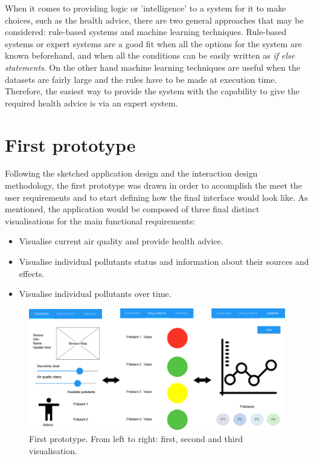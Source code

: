 When it comes to providing logic or 'intelligence' to a system for it to make choices, such as the health advice, there are two general approaches that may be considered: rule-based systems and machine learning techniques. Rule-based systems or expert systems are a good fit when all the options for the system are known beforehand, and when all the conditions can be easily written as \textit{if else statements}. On the other hand machine learning techniques are useful when the datasets are fairly large and the rules have to be made at execution time. Therefore, the easiest way to provide the system with the capability to give the required health advice is via an expert system.

\section{First prototype}
Following the sketched application design and the interaction design methodology, the first prototype was drawn in order to accomplish the meet the user requirements and to start defining how the final interface would look like. As mentioned, the application would be composed of three final distinct visualisations for the main functional requirements:

\begin{itemize}
    \item Visualise current air quality and provide health advice.
    \item Visualise individual pollutants status and information about their sources and effects.
    \item Visualise individual pollutants over time.
\end{itemize}


\begin{figure}[H]
\begin{adjustbox}{width=1.2\textwidth,center=\textwidth}
  \centering
  \includegraphics[scale=1]{images/firstPrototype.png}
\end{adjustbox}
  \caption[Frist prototype]{First prototype. From left to right: first, second and third visualisation.}
  \label{fig:first_visualization_first_prototype}
\end{figure}


